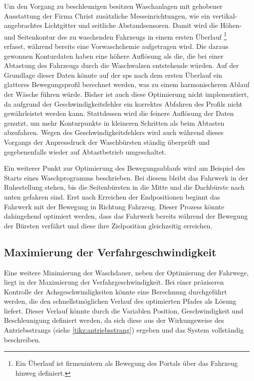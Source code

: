 Um den Vorgang zu beschleunigen besitzen Waschanlagen mit gehobener Ausstattung der Firma Christ zusätzliche Messeinrichtungen, wie ein vertikal-angebrachtes Lichtgitter und seitliche Abstandsensoren. Damit wird die Höhen- und Seitenkontur des zu waschenden Fahrzeugs in einem ersten Überlauf \footnote{Ein Überlauf ist firmenintern als Bewegung des Portals über das Fahrzeug hinweg definiert.} erfasst, während bereits eine Vorwaschchemie aufgetragen wird. Die daraus gewonnen Konturdaten haben eine höhere Auflösung als die, die bei einer Abtastung des Fahrzeugs durch die Waschwalzen entstehende würden. Auf der Grundlage dieser Daten könnte auf der \ac{sps} nach dem ersten Überlauf ein glatteres Bewegungsprofil berechnet werden, was zu einem harmonischeren Ablauf der Wäsche führen würde. Bisher ist auch diese Optimierung nicht implementiert, da aufgrund der Geschwindigkeitsfehler ein korrektes Abfahren des Profils nicht gewährleistet werden kann. Stattdessen wird die feinere Auflösung der Daten genutzt, um mehr Konturpunkte in kleineren Schritten als beim Abtasten abzufahren. Wegen des Geschwindigkeitsfehlers wird auch während dieses Vorgangs der Anpressdruck der Waschbürsten ständig überprüft und gegebenenfalls wieder auf Abtastbetrieb umgeschaltet.

Ein weiterer Punkt zur Optimierung des Bewegungsablaufs wird am Beispiel des Starts eines Waschprogramms beschrieben.
Bei diesem bleibt das Fahrwerk in der Ruhestellung stehen, bis die Seitenbürsten in die Mitte und die Dachbürste nach unten gefahren sind. Erst nach Erreichen der Endpositionen beginnt das Fahrwerk mit der Bewegung in Richtung Fahrzeug. Dieser Prozess könnte dahingehend optimiert werden, dass das Fahrwerk bereits während der Bewegung der Bürsten verfährt und diese ihre Zielposition gleichzeitig erreichen. 

\subsection{Maximierung der Verfahrgeschwindigkeit}
Eine weitere Minimierung der Waschdauer, neben der Optimierung der Fahrwege, liegt in der Maximierung der Verfahrgeschwindigkeit. Bei einer präziseren Kontrolle der Achsgeschwindigkeiten könnte eine Berechnung durchgeführt werden, die den schnellstmöglichen Verlauf des optimierten Pfades als Lösung liefert. Dieser Verlauf könnte durch die Variablen Position, Geschwindigkeit und Beschleunigung definiert werden, da sich diese aus der Wirkungsweise des Antriebsstrangs (siehe \autoref{tikz:antriebsstrang}) ergeben und das System vollständig beschreiben.

